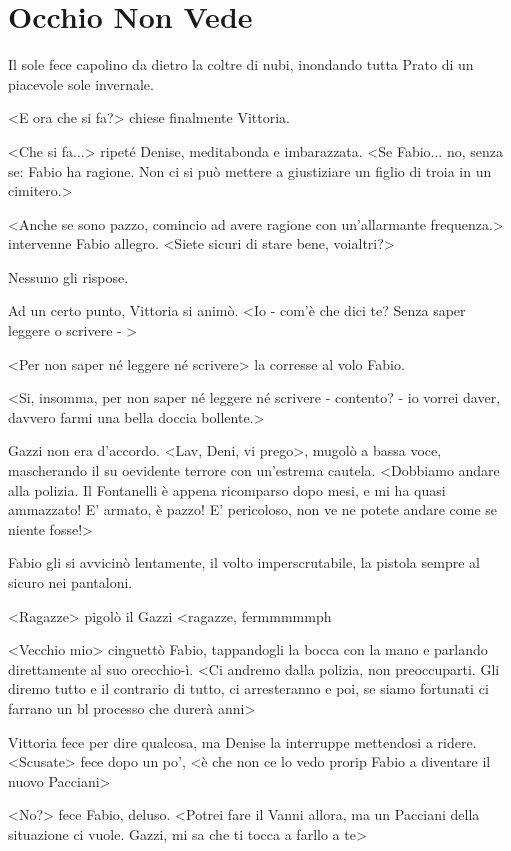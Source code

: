 \chapter{Occhio Non Vede}

Il sole fece capolino da dietro la coltre di nubi, inondando tutta Prato di un piacevole sole invernale.

<E ora che si fa?> chiese finalmente Vittoria.

<Che si fa...> ripeté Denise, meditabonda e imbarazzata. <Se Fabio... no, senza se: Fabio ha ragione. Non ci si può mettere a giustiziare un figlio di troia in un cimitero.>

<Anche se sono pazzo, comincio ad avere ragione con un'allarmante frequenza.> intervenne Fabio allegro. <Siete sicuri di stare bene, voialtri?>

Nessuno gli rispose.

Ad un certo punto, Vittoria si animò. <Io - com'è che dici te? Senza saper leggere o scrivere - >

<Per non saper né leggere né scrivere> la corresse al volo Fabio.

<Si, insomma, per non saper né leggere né scrivere - contento? - io vorrei daver, davvero farmi una bella doccia bollente.>

Gazzi non era d'accordo. <Lav, Deni, vi prego>, mugolò a bassa voce, mascherando il su oevidente terrore con un'estrema cautela. <Dobbiamo andare alla polizia. Il Fontanelli è appena ricomparso dopo mesi, e mi ha quasi ammazzato! E' armato, è pazzo! E' pericoloso, non ve ne potete andare come se niente fosse!>

Fabio gli si avvicinò lentamente, il volto imperscrutabile, la pistola sempre al sicuro nei pantaloni. 

<Ragazze> pigolò il Gazzi <ragazze, fermmmmmph

<Vecchio mio> cinguettò Fabio, tappandogli la bocca con la mano e parlando direttamente al suo orecchio-ì. <Ci andremo dalla polizia, non preoccuparti. Gli diremo tutto e il contrario di tutto, ci arresteranno e poi, se siamo fortunati ci farrano un bl processo che durerà anni>

Vittoria fece per dire qualcosa, ma Denise la interruppe mettendosi a ridere. <Scusate> fece dopo un po', <è che non ce lo vedo prorip Fabio a diventare il nuovo Pacciani>

<No?> fece Fabio, deluso. <Potrei fare il Vanni allora, ma un  Pacciani della situazione ci vuole. Gazzi, mi sa che ti tocca a farllo a te>


